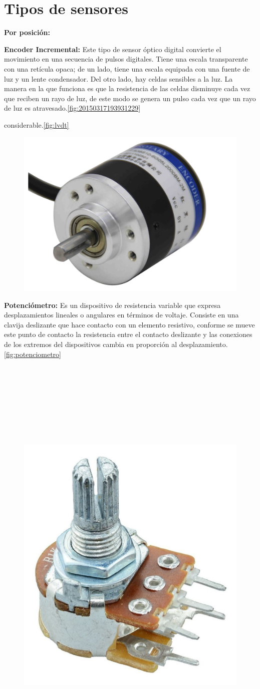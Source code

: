 \section{Tipos de sensores}
\textbf{Por posición:}

\textbf{Encoder Incremental:} Este tipo de sensor óptico digital convierte el movimiento en una secuencia de pulsos digitales. Tiene una escala transparente con una retícula opaca; de un lado, tiene una escala equipada con una fuente de luz y un lente condensador. Del otro lado, hay celdas sensibles a la luz. La manera en la que funciona es que la resistencia de las celdas disminuye cada vez que reciben un rayo de luz, de este modo se genera un pulso cada vez que un rayo de luz es atravesado.\autoref{fig:20150317193931229}

considerable.\autoref{fig:lvdt} \\
\begin{figure}[h]
	\centering
	\includegraphics[width=0.4\linewidth]{portada/20150317193931229}
	\caption{}
	\label{fig:20150317193931229}
\end{figure}

\textbf{Potenciómetro:} Es un dispositivo de resistencia variable que expresa desplazamientos lineales o angulares en términos de voltaje. Consiste en una clavija deslizante que hace contacto con un elemento resistivo, conforme se mueve este punto de contacto la resistencia entre el contacto deslizante y las conexiones de los extremos del dispositivos cambia en proporción al desplazamiento. \autoref{fig:potenciometro}\\\\\\\\\\\\\\\\\\

\begin{figure}[h]
	\centering
	\includegraphics[width=0.2\linewidth, height=0.2\textheight]{img/potenciometro}
	\caption[Potenciómetro]{}
	\label{fig:potenciometro}
\end{figure}



